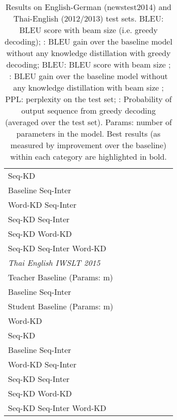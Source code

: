 \documentclass[11pt,letterpaper]{article}
\begin{document}
\begin{table*}[!ht]
\begin{tabular}{l c c  c c r r r }
\hspace{4mm}  Seq-KD  &  & & & &  &  &   \\
 \hspace{4mm} Baseline  Seq-Inter  &  & & & &  &  &  \\
\hspace{4mm} Word-KD  Seq-Inter   &  & & & & &  &  \\
\hspace{4mm}  Seq-KD  Seq-Inter  &  & & & &  &  &  \\
\hspace{4mm} Seq-KD  Word-KD &  & & & & &  &   \\
\hspace{4mm} Seq-KD  Seq-Inter  Word-KD  &  & & & & & &   \\

\bottomrule
\toprule
\textit{Thai  English IWSLT 2015} \\ 
\midrule
Teacher Baseline   (Params: m) &  &   & &    &  &  &  \\
\hspace{4mm}  Baseline  Seq-Inter   &  & & & & &  &   \\
\midrule
Student Baseline   (Params: m) &  &  & &    & &  &   \\
\hspace{4mm}  Word-KD   &  & & &  & &  &  \\
\hspace{4mm}  Seq-KD   &  & & & & &  &   \\
\hspace{4mm}  Baseline  Seq-Inter   &  & & & & &  &   \\
\hspace{4mm} Word-KD  Seq-Inter  &  & & &  & &  &    \\
\hspace{4mm}  Seq-KD  Seq-Inter   &  & & &  & &  &   \\
\hspace{4mm}  Seq-KD  Word-KD   &  & & &   && &  \\
\hspace{4mm} Seq-KD  Seq-Inter  Word-KD   &  & & &  & &  &  \\
\bottomrule
\end{tabular}
\caption{Results on English-German (newstest2014) and Thai-English (2012/2013) test sets.
BLEU: BLEU score with beam size  (i.e. greedy
decoding); : BLEU gain over the baseline model without any knowledge distillation with greedy decoding;  BLEU: BLEU score with beam size ;
 : BLEU gain over the baseline model without any knowledge distillation with beam size ; 
PPL: perplexity on the test set; : Probability of output sequence from greedy decoding 
(averaged over the test set). Params: number of parameters in the model. Best results (as measured by improvement over the baseline)
within each category are highlighted in bold.}
\end{table*}
\end{document}

